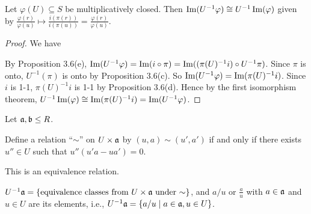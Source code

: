 \begin{proposition}
    Let $\varphi(U) \subseteq S$ be multiplicatively closed. Then $\operatorname{Im}(U^{-1}\varphi) \cong U^{-1} \operatorname{Im}(\varphi)$ given by $\frac{\varphi(r)}{\varphi(u)} \mapsto \frac{i(\pi(r))}{i(\pi(u))} = \frac{\varphi(r)}{\varphi(u)}$.
\end{proposition}

\begin{proof}
    We have 
    \begin{center}
    \end{center}
    By Proposition 3.6(e), $\operatorname{Im}(U^{-1}\varphi) = \operatorname{Im}(i \circ \pi) = \operatorname{Im}((\pi(U)^{-1}i) \circ U^{-1}\pi)$. Since $\pi$ is onto, $U^{-1}(\pi)$ is onto by Proposition 3.6(c). So $\operatorname{Im}(U^{-1}\varphi) = \operatorname{Im}(\pi(U)^{-1}i)$. Since $i$ is 1-1, $\pi(U)^{-1}i$ is 1-1 by Proposition 3.6(d). Hence by the first isomorphism theorem, $U^{-1}\operatorname{Im}(\varphi) \cong \operatorname{Im}(\pi(U)^{-1}i) = \operatorname{Im}(U^{-1}\varphi)$.
\end{proof}

\noindent Let $\mathfrak{a},\mathfrak{b} \leq R$.

\begin{definition}
    Define a relation ``$\sim$'' on $U \times \mathfrak{a}$ by $(u,a) \sim (u',a')$ if and only if there exists $u'' \in U$ such that $u''(u'a - ua') = 0$.
\end{definition}

\begin{fact}
    This is an equivalence relation.
\end{fact}

\begin{notation}
    $U^{-1}\mathfrak{a} = \{\text{equivalence classes from $U \times \mathfrak{a}$ under $\sim$}\}$, and $a/u$ or $\frac{a}{u}$ with $a \in \mathfrak{a}$ and $u \in U$ are its elements, i.e., $U^{-1}\mathfrak{a} = \{a/u \mid a \in \mathfrak{a}, u \in U\}$.
\end{notation}

